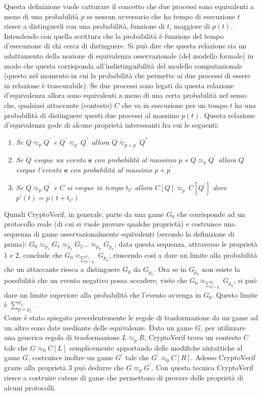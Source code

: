 \documentclass[a4paper,openright,twoside,12pt]{report}
\begin{document}
Questa definizione vuole catturare il concetto che due processi sono equivalenti a meno di una probabilit\`a $p$ se nessun avversario che ha tempo di esecuzione $t$ riesce
a distinguerli con una probabilit\`a, funzione di $t$, maggiore di $p(t)$. Intendendo con quella scrittura che la probabilit\`a \`e funzione del tempo d'esecuzione di chi cerca di distinguere. 
Si pu\`o dire che questa relazione sia un adattamento della nozione di equivalenza osservazionale (del modello formale) in modo che questa corrisponda all'indistinguibilit\`a del modello computazionale 
(questo nel momento in cui la probabilit\`a che permette ai due processi di essere in relazione \`e trascurabile). Se due processi sono legati da questa relazione d'equivalenza allora sono equivalenti a meno di una certa probabilit\`a nel senso che, 
qualsiasi attaccante (contesto) $C$ che va in esecuzione per un tempo $t$ ha una probabilit\`a di distinguere questi due processi al massimo $p(t)$.
Questa relazione d'equivalenza gode di alcune propriet\`a interessanti fra cui le seguenti:
\begin{enumerate}
 \item \emph{Se $Q \approx_p Q^{'}$ e $Q^{'} \approx_{p^{'}} Q^{''}$ allora $Q \approx_{p+p^{'}} Q^{''} $}
 \item \emph{Se $Q$ esegue un evento $\texttt{e}$ con probabilit\`a al massimo $p$ e $Q \approx_p Q^{'}$ allora $Q^{'}$ esegue l'evento $\texttt{e}$ con probabilit\`a al massimo $p+p^{'}$}
 \item \emph{Se $Q \approx_p Q^{'}$ e $C$ si esegue in tempo $t_C$ allora $C[Q] \approx_{p^{'}} C[Q^{'}]$ dove $p'(t)=p(t+t_C)$}
\end{enumerate}

Quindi CryptoVerif, in generale, parte da una game $G_0$ che corrisponde ad un protocollo reale (di cui si vuole provare qualche propriet\`a) e costruisce una sequenza di game 
osservazionalmente equivalenti (secondo la definizione di prima): $G_0 \approx_{p_1} G_1 \approx_{p_2} G_2 \dots \approx_{p_n} G_{p_{n}} $; data questa sequenza, 
attraverso le propriet\`a 1 e 2, conclude che $G_0  \approx_{\sum_{p=p_1}^{p_n}} G_{p_{n}} $, riuscendo cos\`i a dare un limite alla probabilit\`a che un attaccante riesca a distinguere
$G_0$ da $G_{p_{n}}$. Ora se in $G_{p_{n}}$ non esiste la possibilit\`a che un evento negativo possa accadere, visto che $G_0  \approx_{\sum_{p=p_1}^{p_n}} G_{p_{n}} $, si pu\`o dare un limite superiore alla probabilit\`a che l'evento avvenga in $G_0$.
Questo limite \`e $\sum_{p=p_1}^{p_n}$.\\Come \`e stato spiegato precedentemente le regole di trasformazione da un game ad un altro sono date mediante delle equivalenze. 
Dato un game $G$, per utilizzare una generica regola di trasformazione  $L \approx_p R$, CryptoVerif trova un contesto $C$ tale che $G \approx_0 C[L] $ semplicemente 
apportando delle modifiche sintattiche al game $G$, costruisce inoltre un game $G^{'}$ tale che $G^{'} \approx_0 C[R]$. Adesso CryptoVerif grazie alla propriet\`a 3 pu\`o dedurre che $G \approx_p G^{'}$. Con questa tecnica CryptoVerif riesce a costruire catene
di game che permettono di provare delle propriet\`a di alcuni protocolli.
\newpage
\end{document}
